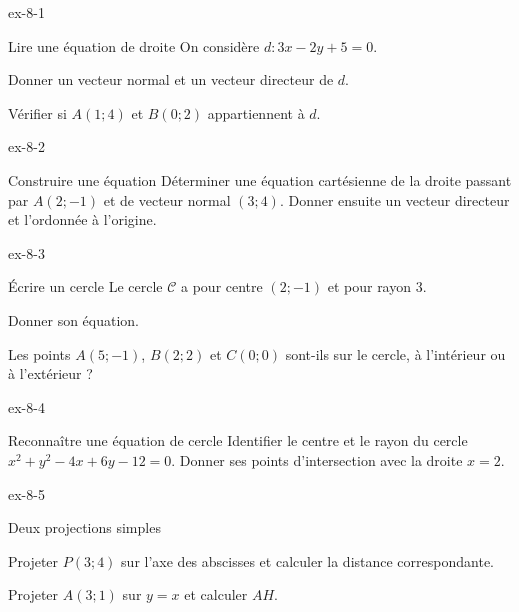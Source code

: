 \begin{blocLivre}{ex-8-1}
\begin{exercice}[1]{Lire une équation de droite}
On considère $d:3x-2y+5=0$.\begin{questions}
\item Donner un vecteur normal et un vecteur directeur de $d$.
\item Vérifier si $A(1;4)$ et $B(0;2)$ appartiennent à $d$.
\end{questions}

\label{figgeo-08-01-ex}
\end{exercice}
\end{blocLivre}
\begin{blocLivre}{ex-8-2}
\begin{exercice}[1]{Construire une équation}
Déterminer une équation cartésienne de la droite passant par $A(2;-1)$ et de vecteur normal $(3;4)$. Donner ensuite un vecteur directeur et l’ordonnée à l’origine.
\label{figgeo-08-02-ex}
\end{exercice}
\end{blocLivre}
\begin{blocLivre}{ex-8-3}
\begin{exercice}[1]{Écrire un cercle}
Le cercle $\mathcal C$ a pour centre $(2;-1)$ et pour rayon 3.\begin{questions}
\item Donner son équation.
\item Les points $A(5;-1)$, $B(2;2)$ et $C(0;0)$ sont-ils sur le cercle, à l’intérieur ou à l’extérieur ?
\end{questions}

\label{figgeo-08-03-ex}
\end{exercice}
\end{blocLivre}
\begin{blocLivre}{ex-8-4}
\begin{exercice}[1]{Reconnaître une équation de cercle}
Identifier le centre et le rayon du cercle $x^2+y^2-4x+6y-12=0$. Donner ses points d’intersection avec la droite $x=2$.
\label{figgeo-08-04-ex}
\end{exercice}
\end{blocLivre}
\begin{blocLivre}{ex-8-5}
\begin{exercice}[1]{Deux projections simples}
\begin{questions}
\item Projeter $P(3;4)$ sur l’axe des abscisses et calculer la distance correspondante.
\item Projeter $A(3;1)$ sur $y=x$ et calculer $AH$.
\end{questions}

\label{figgeo-08-05-ex}
\end{exercice}
\end{blocLivre}
